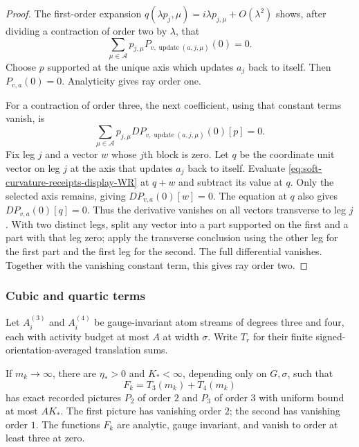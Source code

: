 \begin{proof}
The first-order expansion $q(\lambda p_j,\mu)=i\lambda p_{j,\mu}
+O(\lambda^2)$ shows, after dividing a contraction of order two by
$\lambda$, that
\[
 \sum_{\mu\in\mathcal A}p_{j,\mu}
 P_{v,\operatorname{update}(a,j,\mu)}(0)=0.
\]
Choose $p$ supported at the unique axis which updates $a_j$ back to
itself. Then $P_{v,a}(0)=0$. Analyticity gives ray order one.

For a contraction of order three, the next coefficient, using that
constant terms vanish, is
\begin{equation}
 \sum_{\mu\in\mathcal A}p_{j,\mu}
 D P_{v,\operatorname{update}(a,j,\mu)}(0)[p]=0. \label{eq:soft-curvature-receipts-display-WR}
\end{equation}
Fix leg $j$ and a vector $w$ whose $j$th block is zero. Let $q$ be the
coordinate unit vector on leg $j$ at the axis that updates $a_j$ back
to itself. Evaluate \eqref{eq:soft-curvature-receipts-display-WR} at $q+w$ and subtract its value at $q$. Only
the selected axis remains, giving
$DP_{v,a}(0)[w]=0$. The equation at $q$ also gives
$DP_{v,a}(0)[q]=0$. Thus the derivative vanishes on all vectors
transverse to leg $j$. With two distinct legs, split any vector into a
part supported on the first and a part with that leg zero; apply the
transverse conclusion using the other leg for the first part and the
first leg for the second. The full differential vanishes. Together with
the vanishing constant term, this gives ray order two.
\end{proof}

\subsubsection{Cubic and quartic terms}

Let $A^{(3)}_i$ and $A^{(4)}_i$ be gauge-invariant atom streams of degrees
three and four, each with activity budget at most $A$ at width $\sigma$.
Write $T_r$ for their finite signed-orientation-averaged translation sums.

\begin{proposition}
\label{prop:ex-extra-curves}
If $m_k\to\infty$, there are $\eta_*>0$ and $K_*<\infty$, depending
only on $G,\sigma$, such that
\[
        F_k=T_3(m_k)+T_4(m_k)
\]
has exact recorded pictures $P_2$ of order $2$ and $P_3$ of order $3$ with
uniform bound at most $A K_*$. The first picture has vanishing order $2$;
the second has vanishing order $1$. The functions $F_k$ are analytic,
gauge invariant, and vanish to order at least three at zero.
\end{proposition}

